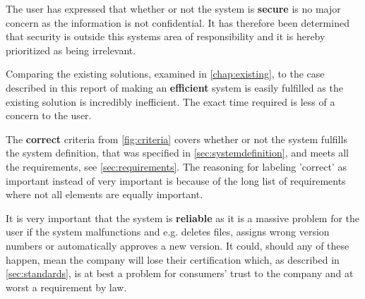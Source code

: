 The user has expressed that whether or not the system is \textbf{secure} is no major concern as the information is not confidential.
It has therefore been determined that security is outside this systems area of responsibility and it is hereby prioritized as being irrelevant.

Comparing the existing solutions, examined in \cref{chap:existing}, to the case described in this report of making an \textbf{efficient} system is easily fulfilled as the existing solution is incredibly inefficient.
The exact time required is less of a concern to the user.

The \textbf{correct} criteria from \cref{fig:criteria} covers whether or not the system fulfills the system definition, that was specified in \cref{sec:systemdefinition}, and meets all the requirements, see \cref{sec:requirements}.
The reasoning for labeling 'correct' as important instead of very important is because of the long list of requirements where not all elements are equally important.

It is very important that the system is \textbf{reliable} as it is a massive problem for the user if the system malfunctions and e.g. deletes files, assigns wrong version numbers or automatically approves a new version.
It could, should any of these happen, mean the company will lose their certification which, as described in \cref{sec:standards}, is at best a problem for consumers' trust to the company and at worst a requirement by law.

